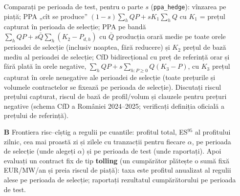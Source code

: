 \begin{itemize}
{Comparați pe perioada de test, pentru o parte $s$ (\texttt{ppa\_hedge}): vînzarea pe piață; PPA „cît se produce'' $(1-s)\sum_hQP+sK_1\sum_hQ$ cu $K_1$ = prețul capturat în perioada de selecție;
PPA pe bandă $\sum_hQP+s\bar Q\sum_h(K_2-P_{d,h})$ cu $\bar Q$ producția orară medie pe toate orele perioadei de selecție (inclusiv noaptea, fără reducere) și $K_2$ prețul de bază mediu al perioadei de selecție; CfD bidirecțional cu preț de referință orar și fără plată în orele negative,
$\sum_hQP+s\sum_{h:P\ge0}Q(K_3-P)$, cu $K_3$ prețul capturat în orele nenegative ale perioadei de selecție (toate prețurile și volumele contractelor se fixează pe perioada de selecție). Discutați riscul prețului capturat, riscul de bază de profil/volum și clauzele pentru prețuri negative (schema CfD a României 2024--2025; verificați definiția oficială a prețului de referință).}
\item[\textbf{B}] %
{Frontiera risc--cîștig a regulii pe cuantile: profitul total, ES$^{95}$ al profitului zilnic, cea mai proastă zi și zilele cu tranzacții pentru fiecare $\alpha$, pe perioada de selecție (unde alegeți $\alpha$) și pe perioada de test (unde raportați).
Apoi evaluați un contract fix de tip \textbf{tolling} (un cumpărător plătește o sumă fixă EUR/MW/an și preia riscul de piață): taxa este profitul anualizat al regulii alese pe perioada de selecție; raportați rezultatul cumpărătorului pe perioada de test.}
\end{itemize}

